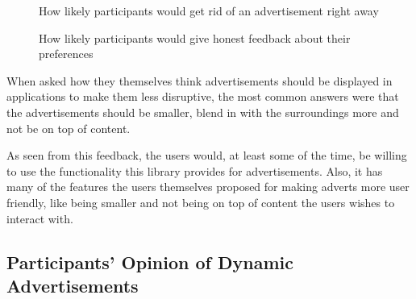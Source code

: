 \begin{figure}
\begin{center}
\caption{How likely participants would get rid of an advertisement right away}
\label{q7}
\end{center}
\end{figure}

\begin{figure}
\begin{center}
\caption{How likely participants would give honest feedback about their preferences}
\label{q}
\end{center}
\end{figure}

When asked how they themselves think advertisements should be displayed in applications to make them less disruptive, the most common answers were that the advertisements should be smaller, blend in with the surroundings more and not be on top of content.

As seen from this feedback, the users would, at least some of the time, be willing to use the functionality this library provides for advertisements. Also, it has many of the features the users themselves proposed for making adverts more user friendly, like being smaller and not being on top of content the users wishes to interact with.

\subsection{Participants' Opinion of Dynamic Advertisements}

